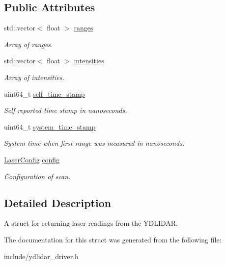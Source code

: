 \subsection*{Public Attributes}
\begin{DoxyCompactItemize}
\item 
std\+::vector$<$ float $>$ \hyperlink{struct_laser_scan_a4d059cb77f0f9f6e558db50c9993f7df}{ranges}\hypertarget{struct_laser_scan_a4d059cb77f0f9f6e558db50c9993f7df}{}\label{struct_laser_scan_a4d059cb77f0f9f6e558db50c9993f7df}

\begin{DoxyCompactList}\small\item\em Array of ranges. \end{DoxyCompactList}\item 
std\+::vector$<$ float $>$ \hyperlink{struct_laser_scan_a6e68040137d787ef7ef47580d147c503}{intensities}\hypertarget{struct_laser_scan_a6e68040137d787ef7ef47580d147c503}{}\label{struct_laser_scan_a6e68040137d787ef7ef47580d147c503}

\begin{DoxyCompactList}\small\item\em Array of intensities. \end{DoxyCompactList}\item 
uint64\+\_\+t \hyperlink{struct_laser_scan_ad37e2a54c7eff58cad7576d51916b859}{self\+\_\+time\+\_\+stamp}\hypertarget{struct_laser_scan_ad37e2a54c7eff58cad7576d51916b859}{}\label{struct_laser_scan_ad37e2a54c7eff58cad7576d51916b859}

\begin{DoxyCompactList}\small\item\em Self reported time stamp in nanoseconds. \end{DoxyCompactList}\item 
uint64\+\_\+t \hyperlink{struct_laser_scan_a1bb6b997ce698fbc516bc20ab3ba3399}{system\+\_\+time\+\_\+stamp}\hypertarget{struct_laser_scan_a1bb6b997ce698fbc516bc20ab3ba3399}{}\label{struct_laser_scan_a1bb6b997ce698fbc516bc20ab3ba3399}

\begin{DoxyCompactList}\small\item\em System time when first range was measured in nanoseconds. \end{DoxyCompactList}\item 
\hyperlink{struct_laser_config}{Laser\+Config} \hyperlink{struct_laser_scan_a5c7dd0b85432e62cf319f2ad4ec058b4}{config}\hypertarget{struct_laser_scan_a5c7dd0b85432e62cf319f2ad4ec058b4}{}\label{struct_laser_scan_a5c7dd0b85432e62cf319f2ad4ec058b4}

\begin{DoxyCompactList}\small\item\em Configuration of scan. \end{DoxyCompactList}\end{DoxyCompactItemize}


\subsection{Detailed Description}
A struct for returning laser readings from the Y\+D\+L\+I\+D\+AR. 

The documentation for this struct was generated from the following file\+:\begin{DoxyCompactItemize}
\item 
include/ydlidar\+\_\+driver.\+h\end{DoxyCompactItemize}
